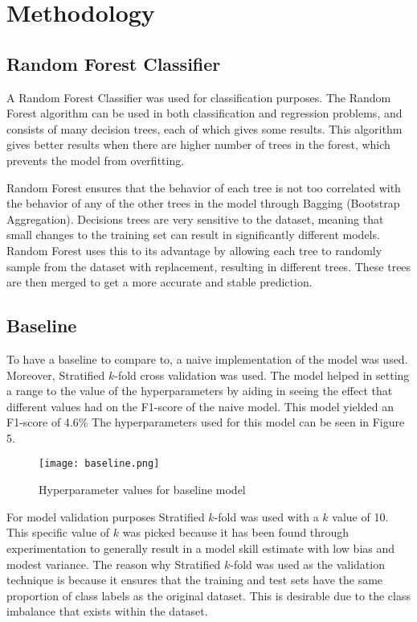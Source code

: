\documentclass[conference]{IEEEtran}
\begin{document}
\section{Methodology}
\subsection{Random Forest Classifier}
A Random Forest Classifier was used for classification purposes. The Random Forest algorithm can be used in both classification and regression problems, and consists of many decision trees, each of which gives some results. This algorithm gives better results when there are higher number of trees in the forest, which prevents the model from overfitting.  

Random Forest ensures that the behavior of each tree is not too correlated with the behavior of any of the other trees in the model through Bagging (Bootstrap Aggregation). Decisions trees are very sensitive to the dataset, meaning that small changes to the training set can result in significantly different models. Random Forest uses this to its advantage by allowing each tree to randomly sample from the dataset with replacement, resulting in different trees. These trees are then merged to get a more accurate and stable prediction.



\subsection{Baseline}
To have a baseline to compare to, a naive implementation of the model was used. Moreover, Stratified $k$-fold cross validation was used. The model helped in setting a range to the value of the hyperparameters by aiding in seeing the effect that different values had on the F1-score of the naive model. This model yielded an F1-score of 4.6\% The hyperparameters used for this model can be seen in Figure 5.
\begin{figure}[hbt!]
\centering
\texttt{[image: baseline.png]}
\caption{Hyperparameter values for baseline model\label{overflow}}
\end{figure}


For model validation purposes Stratified $k$-fold was used with a $k$ value of 10. This specific value of $k$ was picked because it has been found through experimentation to generally result in a model skill estimate with low bias and modest variance. The reason why Stratified $k$-fold was used as the validation technique is because it ensures that the training and test sets have the same proportion of class labels as the original dataset. This is desirable due to the class imbalance that exists within the dataset.
\end{document}
